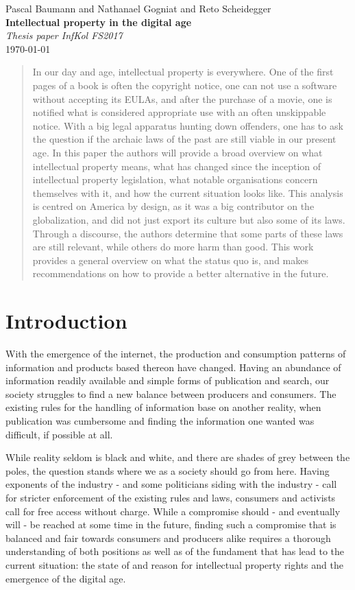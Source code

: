 \documentclass[a4paper]{report}
\newcommand*{\titleAP}{\begingroup %
	\centering
	\vspace*{\baselineskip} %
	
	{\Large Pascal Baumann} and {\Large Nathanael Gogniat} and {\Large Reto Scheidegger}\\[0.167\textheight] %
	
	{\Huge\bfseries Intellectual property in the digital age}\\[\baselineskip]
	
	{\Large \textit{Thesis paper InfKol FS2017}}\\
	\today
	
	\vspace*{3\baselineskip} %
	\endgroup}
\begin{document}
\titleAP

\begin{abstract}
	In our day and age, intellectual property is everywhere. One of the first pages of a book is often the copyright notice, one can not use a software without accepting its EULAs, and after the purchase of a movie, one is notified what is considered appropriate use with an often unskippable notice. With a big legal apparatus hunting down offenders, one has to ask the question if the archaic laws of the past are still viable in our present age. In this paper the authors will provide a broad overview on what intellectual property means, what has changed since the inception of intellectual property legislation, what notable organisations concern themselves with it, and how the current situation looks like. This analysis is centred on America by design, as it was a big contributor on the globalization, and did not just export its culture but also some of its laws. 
	Through a discourse, the authors determine that some parts of these laws are still relevant, while others do more harm than good. This work provides a general overview on what the status quo is, and makes recommendations on how to provide a better alternative in the future.
	
\end{abstract}
\newpage

\tableofcontents

\newpage

\chapter{Introduction}
\label{ch:Intro}
With the emergence of the internet, the production and consumption patterns of information and products based thereon have changed. Having an abundance of information readily available and simple forms of publication and search, our society struggles to find a new balance between producers and consumers. The existing rules for the handling of information base on another reality, when publication was cumbersome and finding the information one wanted was difficult, if possible at all. 

While reality seldom is black and white, and there are shades of grey between the poles, the question stands where we as a society should go from here. Having exponents of the industry - and some politicians siding with the industry - call for stricter enforcement of the existing rules and laws, consumers and activists call for free access without charge. While a compromise should - and eventually will - be reached at some time in the future, finding such a compromise that is balanced and fair towards consumers and producers alike requires a thorough understanding of both positions as well as of the fundament that has lead to the current situation: the state of and reason for intellectual property rights and the emergence of the digital age.
\end{document}

